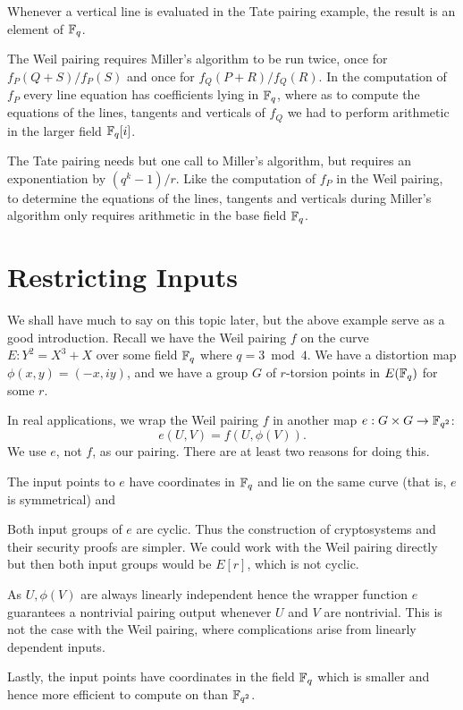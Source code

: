 Whenever a vertical line is evaluated in the Tate pairing
example, the result is an element of $\mathbb{F}_q$.

The Weil pairing requires Miller's algorithm to be run twice, once for
$f_P(Q+S) / f_P(S)$ and once for $f_Q(P+R)/f_Q(R)$. In the computation
of $f_P$ every line equation has coefficients lying in $\mathbb{F}_q$, where
as to compute the equations of the lines, tangents and verticals of $f_Q$
we had to perform arithmetic in the larger field $\mathbb{F}_q[i]$.

The Tate pairing needs but one call to Miller's algorithm,
but requires an exponentiation by $(q^k - 1)/r$. Like the computation
of $f_P$ in the Weil pairing, to determine the equations of the lines,
tangents and verticals during Miller's algorithm only requires arithmetic
in the base field $\mathbb{F}_q$.

\section {Restricting Inputs}

We shall have much to say on this topic later, but the above example
serve as a good introduction.
Recall we have the Weil pairing $f$ on
the curve $E : Y^2 = X^3 + X$ over some field $\mathbb{F}_q$
where $q = 3 \bmod 4$. We have a distortion
map $\phi(x,y) = (-x, i y)$, and we have
a group $G$ of $r$-torsion points in $E(\mathbb{F}_q)$ for some $r$.

In real applications, we wrap the Weil pairing $f$ in another map
$e : G\times G \rightarrow \mathbb{F}_{q^2}$:
\[ e(U, V) = f(U, \phi(V)) . \]
We use $e$, not $f$, as our pairing.
There are at least two reasons for doing this.

The input points to $e$ have coordinates in $\mathbb{F}_q$ and lie on the
same curve (that is, $e$ is symmetrical) and

Both input groups of $e$ are cyclic.
Thus the construction of cryptosystems and their
security proofs are simpler. We could work with the
Weil pairing directly but then both input groups would be $E[r]$,
which is not cyclic.

As $U, \phi(V)$ are always linearly independent hence
the wrapper function $e$ guarantees
a nontrivial pairing output whenever $U$ and $V$ are nontrivial.
This is not the case with the Weil pairing,
where complications arise from linearly dependent inputs.

Lastly, the input points have coordinates in the field $\mathbb{F}_q$ which is
smaller and hence more efficient to compute on than $\mathbb{F}_{q^2}$.


